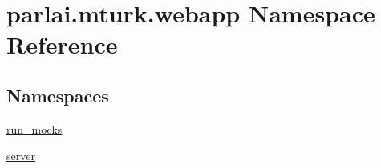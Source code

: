 \hypertarget{namespaceparlai_1_1mturk_1_1webapp}{}\section{parlai.\+mturk.\+webapp Namespace Reference}
\label{namespaceparlai_1_1mturk_1_1webapp}
\subsection*{Namespaces}
\begin{DoxyCompactItemize}
\item 
 \hyperlink{namespaceparlai_1_1mturk_1_1webapp_1_1run__mocks}{run\+\_\+mocks}
\item 
 \hyperlink{namespaceparlai_1_1mturk_1_1webapp_1_1server}{server}
\end{DoxyCompactItemize}

